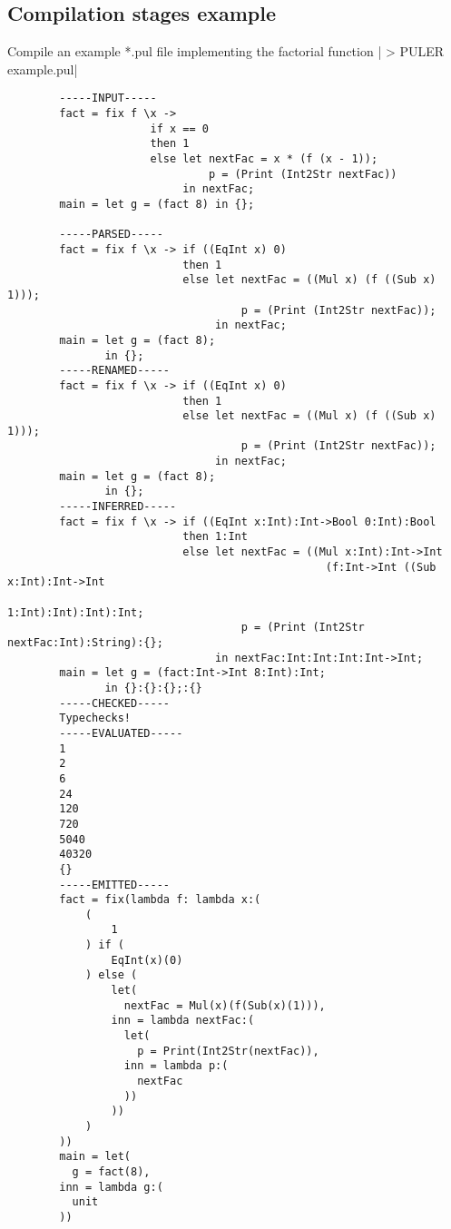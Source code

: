     \subsection{Compilation stages example}\label{compiler_stages}
    Compile an example *.pul file implementing the factorial function
    |    > PULER example.pul|
    \begin{verbatim}
        -----INPUT-----
        fact = fix f \x ->
                      if x == 0
                      then 1
                      else let nextFac = x * (f (x - 1));
                               p = (Print (Int2Str nextFac))
                           in nextFac;
        main = let g = (fact 8) in {};
        
        -----PARSED-----
        fact = fix f \x -> if ((EqInt x) 0)
                           then 1
                           else let nextFac = ((Mul x) (f ((Sub x) 1)));
                                    p = (Print (Int2Str nextFac));
                                in nextFac;
        main = let g = (fact 8);
               in {};
        -----RENAMED-----
        fact = fix f \x -> if ((EqInt x) 0)
                           then 1
                           else let nextFac = ((Mul x) (f ((Sub x) 1)));
                                    p = (Print (Int2Str nextFac));
                                in nextFac;
        main = let g = (fact 8);
               in {};
        -----INFERRED-----
        fact = fix f \x -> if ((EqInt x:Int):Int->Bool 0:Int):Bool
                           then 1:Int
                           else let nextFac = ((Mul x:Int):Int->Int
                                                 (f:Int->Int ((Sub x:Int):Int->Int
                                                                1:Int):Int):Int):Int;
                                    p = (Print (Int2Str nextFac:Int):String):{};
                                in nextFac:Int:Int:Int:Int->Int;
        main = let g = (fact:Int->Int 8:Int):Int;
               in {}:{}:{};:{}
        -----CHECKED-----
        Typechecks!
        -----EVALUATED-----
        1
        2
        6
        24
        120
        720
        5040
        40320
        {}
        -----EMITTED-----
        fact = fix(lambda f: lambda x:(
            (
                1
            ) if (
                EqInt(x)(0)
            ) else (
                let(
                  nextFac = Mul(x)(f(Sub(x)(1))),
                inn = lambda nextFac:(
                  let(
                    p = Print(Int2Str(nextFac)),
                  inn = lambda p:(
                    nextFac
                  ))
                ))
            )
        ))
        main = let(
          g = fact(8),
        inn = lambda g:(
          unit
        ))
    \end{verbatim}